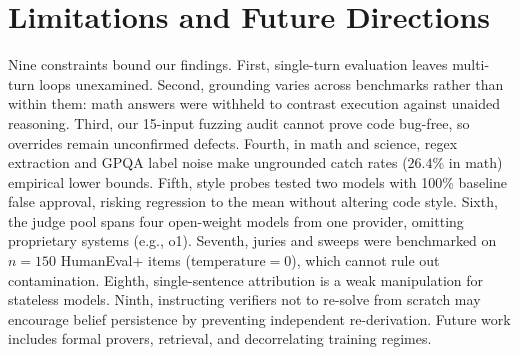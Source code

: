 \section{Limitations and Future Directions}
\label{sec:limitations}

Nine constraints bound our findings. First, single-turn evaluation leaves multi-turn loops unexamined. Second, grounding varies across benchmarks rather than within them: math answers were withheld to contrast execution against unaided reasoning. Third, our 15-input fuzzing audit cannot prove code bug-free, so overrides remain unconfirmed defects. Fourth, in math and science, regex extraction and GPQA label noise make ungrounded catch rates ($26.4\%$ in math) empirical lower bounds. Fifth, style probes tested two models with 100\% baseline false approval, risking regression to the mean without altering code style. Sixth, the judge pool spans four open-weight models from one provider, omitting proprietary systems (e.g., o1). Seventh, juries and sweeps were benchmarked on $n = 150$ HumanEval+ items ($\text{temperature}=0$), which cannot rule out contamination. Eighth, single-sentence attribution is a weak manipulation for stateless models. Ninth, instructing verifiers not to re-solve from scratch may encourage belief persistence by preventing independent re-derivation. Future work includes formal provers, retrieval, and decorrelating training regimes.
